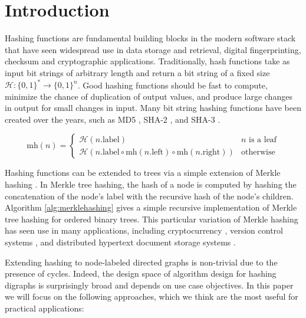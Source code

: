 \documentclass[twoside,leqno]{article}
\begin{document}
\section{Introduction}\label{sec:introduction}

Hashing functions are fundamental building blocks in the modern software stack that have seen widespread use in data storage and retrieval, digital fingerprinting, checksum and cryptographic applications. Traditionally, hash functions take as input bit strings of arbitrary length and return a bit string of a fixed size $\mathcal{H} : \{0,1\}^* \rightarrow \{0,1\}^n$. Good hashing functions should be fast to compute, minimize the chance of duplication of output values, and produce large changes in output for small changes in input. Many bit string hashing functions have been created over the years, such as MD5 \cite{md5}, SHA-2 \cite{sha2}, and SHA-3 \cite{sha3}.

\begin{algorithm}
\caption{Recursive Merkle-tree Hashing of Ordered Binary Tree}
\[
\text{mh}(n) =
\begin{cases} 
    \mathcal{H}(n.\text{label}) & n \text{ is a leaf} \\
    \mathcal{H}(n.\text{label} \circ \text{mh}(n.\text{left}) \circ \text{mh}(n.\text{right})) & \text{otherwise}
\end{cases}
\]
\label{alg:merklehashing}
\end{algorithm}

Hashing functions can be extended to trees via a simple extension of Merkle hashing \cite{merkle1987digital}. In Merkle tree hashing, the hash of a node is computed by hashing the concatenation of the node's label with the recursive hash of the node's children. Algorithm \ref{alg:merklehashing} gives a simple recursive implementation of Merkle tree hashing for ordered binary trees. This particular variation of Merkle hashing has seen use in many applications, including cryptocurrency \cite{bitcoin}, version control systems \cite{git}, and distributed hypertext document storage systems \cite{ipfs}.

Extending hashing to node-labeled directed graphs is non-trivial due to the presence of cycles. Indeed, the design space of algorithm design for hashing digraphs is surprisingly broad and depends on use case objectives. In this paper we will focus on the following approaches, which we think are the most useful for practical applications:
\end{document}
